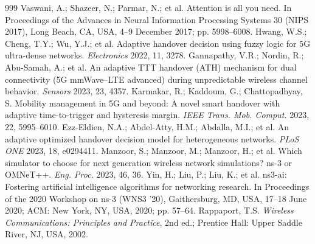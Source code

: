 \documentclass[final,3p,times,twocolumn]{elsarticle}
\begin{document}
\begin{thebibliography}{999}
Vaswani, A.; Shazeer, N.; Parmar, N.; et al. Attention is all you need. In Proceedings of the Advances in Neural Information Processing Systems 30 (NIPS 2017), Long Beach, CA, USA, 4--9 December 2017; pp. 5998--6008.
Hwang, W.S.; Cheng, T.Y.; Wu, Y.J.; et al. Adaptive handover decision using fuzzy logic for 5G ultra-dense networks. {\em Electronics} 2022, 11, 3278.
Gannapathy, V.R.; Nordin, R.; Abu-Samah, A.; et al. An adaptive TTT handover (ATH) mechanism for dual connectivity (5G mmWave--LTE advanced) during unpredictable wireless channel behavior. {\em Sensors} 2023, 23, 4357.
Karmakar, R.; Kaddoum, G.; Chattopadhyay, S. Mobility management in 5G and beyond: A novel smart handover with adaptive time-to-trigger and hysteresis margin. {\em IEEE Trans. Mob. Comput.} 2023, 22, 5995--6010.
Ezz-Eldien, N.A.; Abdel-Atty, H.M.; Abdalla, M.I.; et al. An adaptive optimized handover decision model for heterogeneous networks. {\em PLoS ONE} 2023, 18, e0294411.
Manzoor, S.; Manzoor, M.; Manzoor, H.; et al. Which simulator to choose for next generation wireless network simulations? ns-3 or OMNeT++. {\em Eng. Proc.} 2023, 46, 36.
Yin, H.; Liu, P.; Liu, K.; et al. ns3-ai: Fostering artificial intelligence algorithms for networking research. In Proceedings of the 2020 Workshop on ns-3 (WNS3 '20), Gaithersburg, MD, USA, 17--18 June 2020; ACM: New York, NY, USA, 2020; pp. 57--64.
Rappaport, T.S. \textit{Wireless Communications: Principles and Practice}, 2nd ed.; Prentice Hall: Upper Saddle River, NJ, USA, 2002.
\end{thebibliography}
\end{document}
